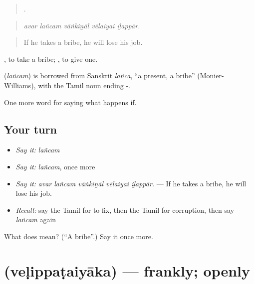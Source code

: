 \begin{quote}
    .
\end{quote}

\begin{quote}
\emph{avar lañcam vāṅkiṉāl vēlaiyai iḻappār.}
\end{quote}

\begin{quote}
If he takes a bribe, he will lose his job.
\end{quote}

 , to take a bribe;  , to give one.

\begin{cousinweb}
\textbf{} (\emph{lañcam}) is borrowed from Sanskrit \emph{lañcā}, \textquotedblleft{}a present, a bribe\textquotedblright{} (Monier-Williams), with the Tamil noun ending -.
\end{cousinweb}

\begin{grammarlens}[title={What you've built}]
One more word for saying what happens if.
\end{grammarlens}

\subsection*{Your turn}
\begin{itemize}
\raggedright
  \item \emph{Say it:} \emph{lañcam}
  \item \emph{Say it:} \emph{lañcam}, once more
  \item \emph{Say it:} \emph{avar lañcam vāṅkiṉāl vēlaiyai iḻappār.} — If he takes a bribe, he will lose his job.
  \item \emph{Recall:} say the Tamil for to fix, then the Tamil for corruption, then say \emph{lañcam} again
\end{itemize}

\begin{tcolorbox}[breakable,colback=teal!4,colframe=teal!35!black,title={Before you move on}]
What does  mean? (\textquotedblleft{}A bribe\textquotedblright{}.) Say it once more.
\end{tcolorbox}
\section[\texorpdfstring{\ta{வெளிப்படையாக} (veḷippaṭaiyāka)}{வெளிப்படையாக (veḷippaṭaiyāka)}]{ (veḷippaṭaiyāka) — frankly; openly}

